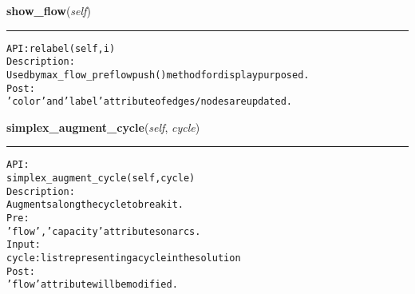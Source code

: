     \vspace{0.5ex}

\hspace{.8\funcindent}\begin{boxedminipage}{\funcwidth}

    \raggedright \textbf{show\_flow}(\textit{self})

    \vspace{-1.5ex}

    \rule{\textwidth}{0.5\fboxrule}
\setlength{\parskip}{2ex}
\begin{alltt}

API: relabel(self, i)
Description:
Used by max\_flow\_preflowpush() method for display purposed.
Post:
    'color' and 'label' attribute of edges/nodes are updated.
\end{alltt}

\setlength{\parskip}{1ex}
    \end{boxedminipage}

    \label{coinor:gimpy:graph:Graph:simplex_augment_cycle}

    \vspace{0.5ex}

\hspace{.8\funcindent}\begin{boxedminipage}{\funcwidth}

    \raggedright \textbf{simplex\_augment\_cycle}(\textit{self}, \textit{cycle})

    \vspace{-1.5ex}

    \rule{\textwidth}{0.5\fboxrule}
\setlength{\parskip}{2ex}
\begin{alltt}

API:
    simplex\_augment\_cycle(self, cycle)
Description:
    Augments along the cycle to break it.
Pre:
    'flow', 'capacity' attributes on arcs.
Input:
    cycle: list representing a cycle in the solution
Post:
    'flow' attribute will be modified.
\end{alltt}

\setlength{\parskip}{1ex}
    \end{boxedminipage}

    \label{coinor:gimpy:graph:Graph:simplex_compute_potentials}


